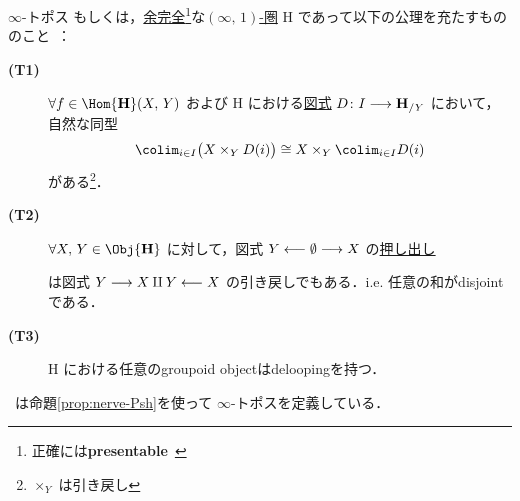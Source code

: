 \documentclass[TQFT_main]{subfiles}
\begin{document}
\begin{mydef}[label=def:infinity-topos]{$\infty$-トポス}
    もしくは，\hyperref[def:complete]{余完全}\footnote{正確には\textbf{presentable}~\cite[p.372, Def5.5.0.18]{lurie2008higher}}な\hyperref[def:infinity-1]{$(\infty,\, 1)$-圏} $\bm{\mathrm{H}}$ であって以下の公理を充たすもののこと~\cite[p.9, Definition5.4]{NSS2012}：
    \begin{description}
        \item[\textbf{(T1)}] $\forall f \in \Hom{\bm{\mathrm{H}}}(X,\, Y)$ および $\bm{\mathrm{H}}$ における\hyperref[def:diagram]{図式} $D \colon I \longrightarrow \bm{\mathrm{H}}_{/Y}$ において，自然な同型
        \begin{align}
            \colim_{i \in I} \bigl( X \times_Y D(i) \bigr) \cong X \times_Y \colim_{i \in I} D(i)
        \end{align}
        がある\footnote{$\times_Y$ は引き戻し}．
        \item[\textbf{(T2)}] $\forall X,\, Y \in \Obj{\bm{\mathrm{H}}}$ に対して，図式 $Y \longleftarrow \emptyset \longrightarrow X$ の\hyperref[def:colim]{押し出し}
        \begin{center}
        \end{center}
        は図式 $Y \longrightarrow X \amalg Y \longleftarrow X$ の引き戻しでもある．i.e. 任意の和がdisjointである．
        \item[\textbf{(T3)}] $\bm{\mathrm{H}}$ における任意のgroupoid objectはdeloopingを持つ．
    \end{description}
    
\end{mydef}

~\cite{alfonsi2023higher}は命題\ref{prop:nerve-Psh}を使って $\infty$-トポスを定義している．
\end{document}
